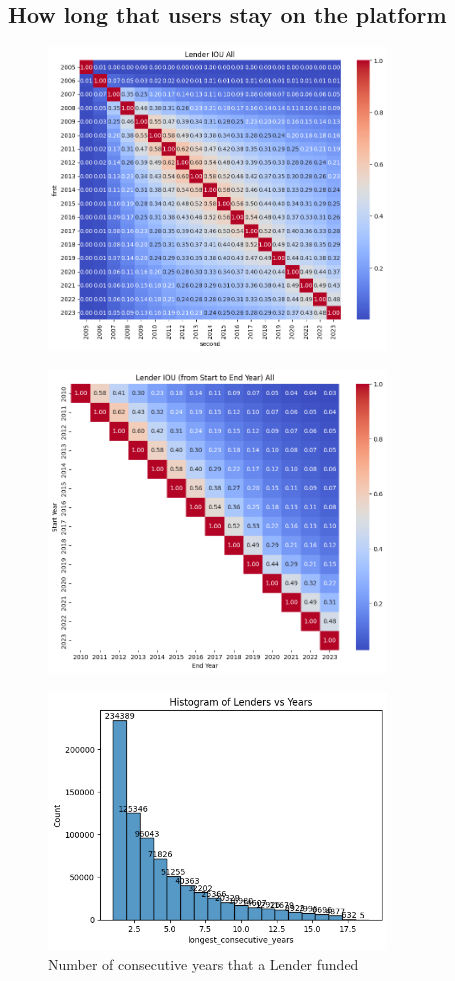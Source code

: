 \subsection{How long that users stay on the platform}


\begin{figure}[H]
	\centering
	\includegraphics[width=0.8\textwidth]{images/active-pairwise.png}
	\caption{}
	\label{fig:active-pairwise}
\end{figure}


\begin{figure}[H]
	\centering
	\includegraphics[width=0.8\textwidth]{images/active-fromto.png}
	\caption{}
	\label{fig:active-fromto}
\end{figure}

\begin{figure}[H]
	\centering
	\includegraphics[width=0.8\textwidth]{images/active-hist.png}
	\caption{Number of consecutive years that a Lender funded}
	\label{fig:active-hist}
\end{figure}